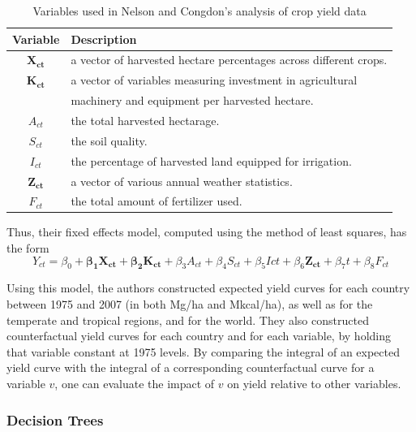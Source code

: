 \documentclass[12pt]{article}
\begin{document}
\begin{table}
\begin{tabularx}{\textwidth}{cl}
\toprule
Variable & Description \\
\midrule
$\pmb{X_{ct}}$ & a vector of harvested hectare percentages across different crops. \\
$\pmb{K_{ct}}$ & a vector of variables measuring investment in agricultural \\
& machinery and equipment per harvested hectare. \\
$A_{ct}$ & the total harvested hectarage. \\
$S_{ct}$ & the soil quality. \\
$I_{ct}$ & the percentage of harvested land equipped for irrigation. \\
$\pmb{Z_{ct}}$ & a vector of various annual weather statistics. \\
$F_{ct}$ & the total amount of fertilizer used. \\
\bottomrule
\end{tabularx}
\caption{Variables used in Nelson and Congdon's analysis of crop yield data \cite{nelson_measuring_2016}}
\label{vars}
\end{table}

Thus, their fixed effects model, computed using the method of least squares, has the form
$$Y_{ct} = \beta_0 + \pmb{\beta_1}\pmb{X_{ct}} + \pmb{\beta_2}\pmb{K_{ct}} + \beta_3A_{ct} + \beta_4S_{ct} + \beta_5I{ct} + \beta_6\pmb{Z_{ct}} + \beta_7t + \beta_8F_{ct}$$

Using this model, the authors constructed expected yield curves for each country between 1975 and 2007 (in both Mg/ha and Mkcal/ha), as well as for the temperate and tropical regions, and for the world. They also constructed counterfactual yield curves for each country and for each variable, by holding that variable constant at 1975 levels. By comparing the integral of an expected yield curve with the integral of a corresponding counterfactual curve for a variable $v$, one can evaluate the impact of $v$ on yield relative to other variables.

\subsubsection{Decision Trees}
\end{document}
